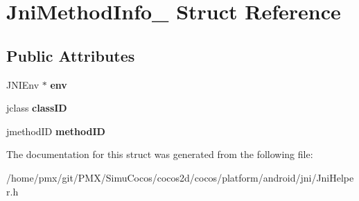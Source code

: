 \hypertarget{structJniMethodInfo__}{}\section{Jni\+Method\+Info\+\_\+ Struct Reference}
\label{structJniMethodInfo__}
\subsection*{Public Attributes}
\begin{DoxyCompactItemize}
\item 
\mbox{\label{structJniMethodInfo___afe079f3ea71db1c51f952279a1225b1a}} 
J\+N\+I\+Env $\ast$ {\bfseries env}
\item 
\mbox{\label{structJniMethodInfo___aa68226580b6090eea22ed8739f6b2a40}} 
jclass {\bfseries class\+ID}
\item 
\mbox{\label{structJniMethodInfo___af17130c5b9e0485f1c43e6af4903155c}} 
jmethod\+ID {\bfseries method\+ID}
\end{DoxyCompactItemize}


The documentation for this struct was generated from the following file\+:\begin{DoxyCompactItemize}
\item 
/home/pmx/git/\+P\+M\+X/\+Simu\+Cocos/cocos2d/cocos/platform/android/jni/Jni\+Helper.\+h\end{DoxyCompactItemize}
